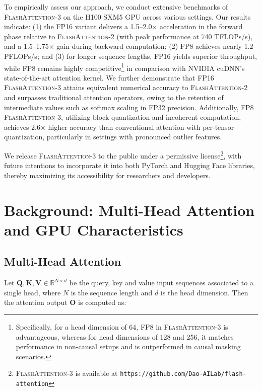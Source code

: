 To empirically assess our approach, we conduct extensive benchmarks of \textsc{FlashAttention-3} on the H100 SXM5 GPU across various settings. Our results indicate: (1) the FP16 variant delivers a 1.5–2.0$\times$ acceleration in the forward phase relative to \textsc{FlashAttention-2} (with peak performance at 740 TFLOPs/s), and a 1.5–1.75$\times$ gain during backward computation; (2) FP8 achieves nearly 1.2 PFLOPs/s; and (3) for longer sequence lengths, FP16 yields superior throughput, while FP8 remains highly competitive\footnote{Specifically, for a head dimension of 64, FP8 in \textsc{FlashAttention-3} is advantageous, whereas for head dimensions of 128 and 256, it matches performance in non-causal setups and is outperformed in causal masking scenarios.} in comparison with NVIDIA cuDNN's state-of-the-art attention kernel. We further demonstrate that FP16 \textsc{FlashAttention-3} attains equivalent numerical accuracy to \textsc{FlashAttention-2} and surpasses traditional attention operators, owing to the retention of intermediate values such as softmax scaling in FP32 precision. Additionally, FP8 \textsc{FlashAttention-3}, utilizing block quantization and incoherent computation, achieves 2.6$\times$ higher accuracy than conventional attention with per-tensor quantization, particularly in settings with pronounced outlier features.

We release \textsc{FlashAttention-3} to the public under a permissive license\footnote{\textsc{FlashAttention-3}
  is available at \texttt{https://github.com/Dao-AILab/flash-attention}}, with future intentions to incorporate it into both PyTorch and Hugging Face libraries, thereby maximizing its accessibility for researchers and developers.

\section{Background: Multi-Head Attention and GPU Characteristics}
\label{sec:background}

\subsection{Multi-Head Attention}
\label{subsec:multi_head_attn}

Let $\mathbf{Q}, \mathbf{K}, \mathbf{V} \in \mathbb{R}^{N \times d}$ be the query, key and value input sequences associated to a single head, where $N$ is the sequence length and $d$ is the head dimension. Then the attention output $\mathbf{O}$ is computed as:

